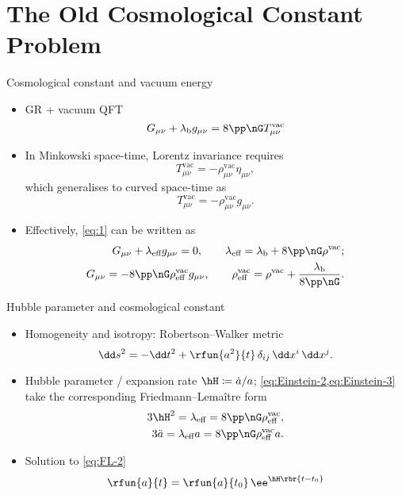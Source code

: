 \documentclass{beamer}
\begin{document}
\section{The Old Cosmological Constant Problem}

\begin{frame}{Cosmological constant and vacuum energy}
\begin{itemize}
\item GR + vacuum QFT
\begin{equation}
G_{\mu\nu} + \lambda_\text{b} g_{\mu\nu} = 8\pp\nG T^\text{vac}_{\mu\nu}
\label{eq:1}
\end{equation}
\item In Minkowski space-time, Lorentz invariance requires
\begin{equation}
T^\text{vac}_{\mu\nu} = -\rho^\text{vac}_{\mu\nu} \eta_{\mu\nu},
\end{equation}
which generalises to curved space-time as
\begin{equation}
T^\text{vac}_{\mu\nu} = -\rho^\text{vac}_{\mu\nu} g_{\mu\nu}.
\end{equation}
\item Effectively, \cref{eq:1} can be written as
\begin{align}
G_{\mu\nu} + \lambda_\text{eff} g_{\mu\nu} = 0, \qquad
\lambda_\text{eff} = \lambda_\text{b} + 8\pp\nG\rho^\text{vac};
\label{eq:Einstein-2}\\
G_{\mu\nu} = -8\pp\nG\rho^\text{vac}_\text{eff} g_{\mu\nu}, \qquad
\rho^\text{vac}_\text{eff} = \rho^\text{vac} +
\frac{\lambda_\text{b}}{8\pp\nG}
\label{eq:Einstein-3}.
\end{align}
\end{itemize}
\end{frame}

\begin{frame}{Hubble parameter and cosmological constant}
\begin{itemize}
\item Homogeneity and isotropy: Robertson--Walker metric
\begin{equation}
\dd s^2 = -\dd t^2 + \rfun{a^2}{t}\,\delta_{ij}\,\dd x^i\,\dd x^j.
\end{equation}
\item Hubble parameter / expansion rate $\hH \coloneqq \dot{a}/a$;
\cref{eq:Einstein-2,eq:Einstein-3} take the corresponding Friedmann--Lemaître
form
\begin{align}
3\hH^2 = \lambda_\text{eff} = 8\pp\nG\rho^\text{vac}_\text{eff},\\
3\ddot{a} = \lambda_\text{eff} a = 8\pp\nG\rho^\text{vac}_\text{eff} a.
\label{eq:FL-2}
\end{align}

\item Solution to \cref{eq:FL-2}
\begin{equation}
\rfun{a}{t} = \rfun{a}{t_0}\,\ee^{\hH \rbr{t-t_0}}
\end{equation}

\end{itemize}

\end{frame}
\end{document}

